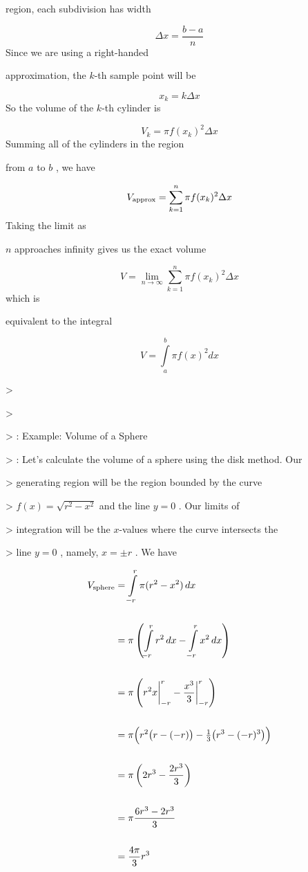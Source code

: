 region, each subdivision has width



$$\Delta x=\frac{b-a}{n}$$ Since we are using a right-handed

approximation, the $k$-th sample point will be



$$x _k=k\Delta x$$ So the volume of the $k$-th cylinder is



$$V _k=\pi f(x _k)^2\Delta x$$ Summing all of the cylinders in the region

from $a$ to $b$ , we have



$$V _{\rm approx}=\sum _{k=1}^n \pi f(x _k)^2\Delta x$$ Taking the limit as

$n$ approaches infinity gives us the exact volume



$$V=\lim_{n\to\infty}\sum _{k=1}^n \pi f(x _k)^2\Delta x$$ which is

equivalent to the integral



$$V=\int\limits _a^b \pi f(x)^2dx$$



> 

>

> :   Example: Volume of a Sphere

> :   Let's calculate the volume of a sphere using the disk method. Our

>     generating region will be the region bounded by the curve

>     $f(x)=\sqrt{r^2-x^2}$ and the line $y=0$ . Our limits of

>     integration will be the $x$-values where the curve intersects the

>     line $y=0$ , namely, $x=\pm r$ . We have

\begin{align} V _{\rm sphere} &= \int\limits _{-r}^r \pi(r^2-x^2)\,dx \\\\ &= \pi\left(\int\limits _{-r}^r r^2\,dx - \int\limits _{-r}^r x^2\,dx\right) \\\\ &= \pi\left(r^2 x\bigg| _{-r}^r - \frac{x^3}{3}\bigg| _{-r}^r\right) \\\\ &= \pi\Big(r^2\bigl(r - (-r)\bigr) - \tfrac{1}{3}\bigl(r^3 - (-r)^3\bigr)\Big) \\\\ &= \pi\left(2r^3 - \frac{2r^3}{3}\right) \\\\ &= \pi\frac{6r^3 - 2r^3}{3} \\\\ &= \frac{4\pi}{3}r^3 \end{align} 



